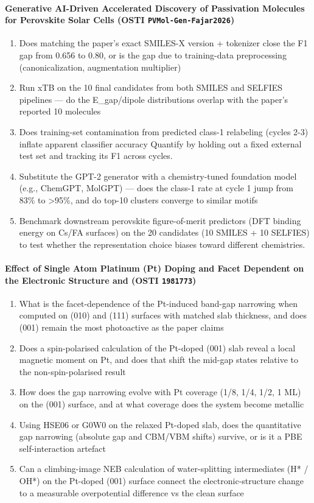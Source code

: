 \paragraph{Generative AI-Driven Accelerated Discovery of Passivation Molecules for Perovskite Solar Cells \textnormal{\small(OSTI \texttt{PVMol-Gen-Fajar2026})}}
\begin{enumerate}[leftmargin=1.6em,itemsep=0.2em,topsep=0.2em,label=Q\arabic*.]
\item Does matching the paper's exact SMILES-X version + tokenizer close the F1 gap from 0.656 to 0.80, or is the gap due to training-data preprocessing (canonicalization, augmentation multiplier)
\item Run xTB on the 10 final candidates from both SMILES and SELFIES pipelines --- do the E\_gap/dipole distributions overlap with the paper's reported 10 molecules
\item Does training-set contamination from predicted class-1 relabeling (cycles 2-3) inflate apparent classifier accuracy Quantify by holding out a fixed external test set and tracking its F1 across cycles.
\item Substitute the GPT-2 generator with a chemistry-tuned foundation model (e.g., ChemGPT, MolGPT) --- does the class-1 rate at cycle 1 jump from 83\% to \textgreater{}95\%, and do top-10 clusters converge to similar motifs
\item Benchmark downstream perovskite figure-of-merit predictors (DFT binding energy on Cs/FA surfaces) on the 20 candidates (10 SMILES + 10 SELFIES) to test whether the representation choice biases toward different chemistries.
\end{enumerate}
\paragraph{Effect of Single Atom Platinum (Pt) Doping and Facet Dependent on the Electronic Structure and  \textnormal{\small(OSTI \texttt{1981773})}}
\begin{enumerate}[leftmargin=1.6em,itemsep=0.2em,topsep=0.2em,label=Q\arabic*.]
\item What is the facet-dependence of the Pt-induced band-gap narrowing when computed on (010) and (111) surfaces with matched slab thickness, and does (001) remain the most photoactive as the paper claims
\item Does a spin-polarised calculation of the Pt-doped (001) slab reveal a local magnetic moment on Pt, and does that shift the mid-gap states relative to the non-spin-polarised result
\item How does the gap narrowing evolve with Pt coverage (1/8, 1/4, 1/2, 1 ML) on the (001) surface, and at what coverage does the system become metallic
\item Using HSE06 or G0W0 on the relaxed Pt-doped slab, does the quantitative gap narrowing (absolute gap and CBM/VBM shifts) survive, or is it a PBE self-interaction artefact
\item Can a climbing-image NEB calculation of water-splitting intermediates (H* / OH*) on the Pt-doped (001) surface connect the electronic-structure change to a measurable overpotential difference vs the clean surface
\end{enumerate}

